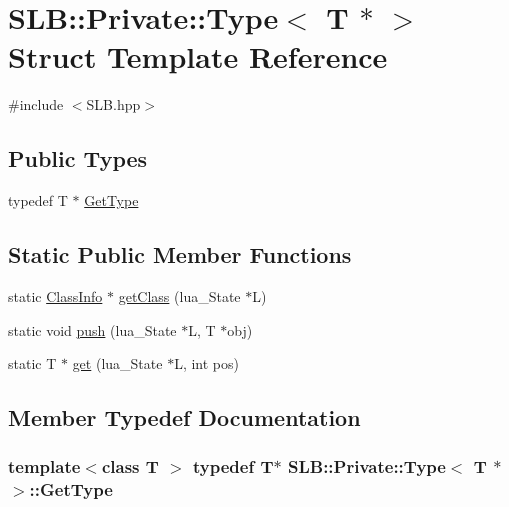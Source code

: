 \hypertarget{structSLB_1_1Private_1_1Type_3_01T_01_5_01_4}{}\section{S\+LB\+:\+:Private\+:\+:Type$<$ T $\ast$ $>$ Struct Template Reference}
\label{structSLB_1_1Private_1_1Type_3_01T_01_5_01_4}


{\ttfamily \#include $<$S\+L\+B.\+hpp$>$}

\subsection*{Public Types}
\begin{DoxyCompactItemize}
\item 
typedef T $\ast$ \hyperlink{structSLB_1_1Private_1_1Type_3_01T_01_5_01_4_a937be229ddf0b5ab5718abf97ac159fc}{Get\+Type}
\end{DoxyCompactItemize}
\subsection*{Static Public Member Functions}
\begin{DoxyCompactItemize}
\item 
static \hyperlink{classSLB_1_1ClassInfo}{Class\+Info} $\ast$ \hyperlink{structSLB_1_1Private_1_1Type_3_01T_01_5_01_4_a6b9cf704f3f837be2de23cc4fa2c981d}{get\+Class} (lua\+\_\+\+State $\ast$L)
\item 
static void \hyperlink{structSLB_1_1Private_1_1Type_3_01T_01_5_01_4_a01e9cf515934e7d69e621300a9354d1b}{push} (lua\+\_\+\+State $\ast$L, T $\ast$obj)
\item 
static T $\ast$ \hyperlink{structSLB_1_1Private_1_1Type_3_01T_01_5_01_4_ae0d97062fba4cfb149d513d002a83b3a}{get} (lua\+\_\+\+State $\ast$L, int pos)
\end{DoxyCompactItemize}


\subsection{Member Typedef Documentation}
\subsubsection[{\texorpdfstring{Get\+Type}{GetType}}]{\setlength{\rightskip}{0pt plus 5cm}template$<$class T $>$ typedef T$\ast$ {\bf S\+L\+B\+::\+Private\+::\+Type}$<$ T $\ast$ $>$\+::{\bf Get\+Type}}\hypertarget{structSLB_1_1Private_1_1Type_3_01T_01_5_01_4_a937be229ddf0b5ab5718abf97ac159fc}{}\label{structSLB_1_1Private_1_1Type_3_01T_01_5_01_4_a937be229ddf0b5ab5718abf97ac159fc}



